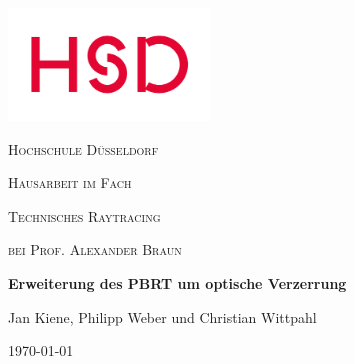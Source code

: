 \newcommand{\docTitel}{Erweiterung des PBRT um optische Verzerrung}
\newcommand{\docUebertitel}{Hausarbeit}
\newcommand{\docAutor}{Jan Kiene, Philipp Weber und Christian Wittpahl}
\newcommand{\docProf}{Prof. Alexander Braun}

\begin{titlepage}
	\centering
	\includegraphics[width=0.40\textwidth]{img/hsd-logo}\par
	\vspace{0.5cm}
	{\scshape\LARGE Hochschule Düsseldorf\par}
	\vspace{1.5cm}
	
	{\scshape\Huge Hausarbeit im Fach\par}
	{\scshape\Huge Technisches Raytracing\par}
	
	{\scshape\Large bei \docProf \par}
	
	\vspace{1.5cm}
	{\Huge\bfseries \docTitel \par}
	\vspace{1 cm}	
	{\LARGE \docAutor \par}
	\vfill
	
	{\large \today\par}
\end{titlepage}